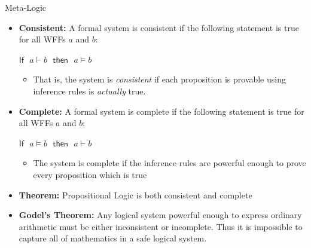 \documentclass[11pt,t,pdf,xcolor=svgnames,aspectratio=169]{beamer}
\providecommand{\tightlist}{%
  \setlength{\itemsep}{5pt}\setlength{\parskip}{0pt}}
\begin{document}
\begin{frame}{Meta-Logic}
\protect\hypertarget{meta-logic-2}{}
\begin{itemize}
\item
  \textbf{Consistent:} A formal system is consistent if the following
  statement is true for all WFFs \(a\) and \(b\):

  \(\textsf{If }\,\, a \vdash b\,\,\textsf{ then }\,\, a \vDash b\)

  \begin{itemize}
  \tightlist
  \item
    That is, the system is \emph{consistent} if each proposition is
    provable using inference rules is \emph{actually} true.
  \end{itemize}
\item
  \textbf{Complete:} A formal system is complete if the following
  statement is true for all WFFs \(a\) and \(b\):

  \(\textsf{If }\,\, a \vDash b\,\, \textsf{ then }\,\, a \vdash b\)

  \begin{itemize}
  \tightlist
  \item
    The system is complete if the inference rules are powerful enough to
    prove every proposition which is true
  \end{itemize}
\item
  \textbf{Theorem:} Propositional Logic is both consistent and complete
\item
  \textbf{Godel's Theorem:} Any logical system powerful enough to
  express ordinary arithmetic must be either inconsistent or incomplete.
  Thus it is impossible to capture all of mathematics in a safe logical
  system.
\end{itemize}
\end{frame}
\end{document}
